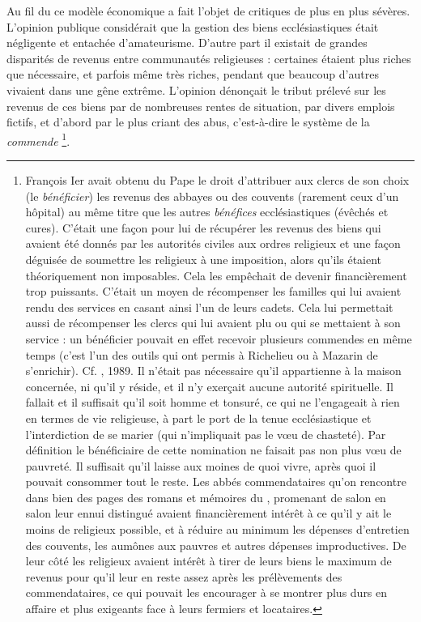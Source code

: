  Au fil du  ce modèle économique a fait l'objet de critiques de plus en plus sévères. L'opinion publique considérait que la gestion des biens ecclésiastiques était négligente et entachée d'amateurisme. D'autre part il existait de grandes disparités de revenus entre communautés religieuses : certaines étaient plus riches que nécessaire, et parfois même très riches, pendant que beaucoup d'autres vivaient dans une gêne extrême. L'opinion dénonçait le tribut prélevé sur les revenus de ces biens par de nombreuses rentes de situation, par divers emplois fictifs, et d'abord par le plus criant des abus, c'est-à-dire le système de la \emph{commende}
\footnote{François Ier avait obtenu du Pape le droit d'attribuer aux clercs de son choix (le \emph{bénéficier}) les revenus des abbayes ou des couvents (rarement ceux d'un hôpital) au même titre que les autres \emph{bénéfices} ecclésiastiques (évêchés et cures). C'était une façon pour lui de récupérer les revenus des biens qui avaient été donnés par les autorités civiles aux ordres religieux et une façon déguisée de soumettre les religieux à une imposition, alors qu'ils étaient théoriquement non imposables. Cela les empêchait de devenir financièrement trop puissants. C'était un moyen de récompenser les familles qui lui avaient rendu des services en casant ainsi l'un de leurs cadets. Cela lui permettait aussi de récompenser les clercs qui lui avaient plu ou qui se mettaient à son service : un bénéficier pouvait en effet recevoir plusieurs commendes en même temps (c'est l'un des outils qui ont permis à Richelieu ou à Mazarin de s'enrichir). Cf. , 1989. Il n'était pas nécessaire qu'il appartienne à la maison concernée, ni qu'il y réside, et il n'y exerçait aucune autorité spirituelle. Il fallait et il suffisait qu'il soit homme et tonsuré, ce qui ne l'engageait à rien en termes de vie religieuse, à part le port de la tenue ecclésiastique et l'interdiction de se marier (qui n'impliquait pas le vœu de chasteté). Par définition le bénéficiaire de cette nomination ne faisait pas non plus vœu de pauvreté. Il suffisait qu'il laisse aux moines de quoi vivre, après quoi il pouvait consommer tout le reste. Les abbés commendataires qu'on rencontre dans bien des pages des romans et mémoires du , promenant de salon en salon leur ennui distingué avaient financièrement intérêt à ce qu'il y ait le moins de religieux possible, et à réduire au minimum les dépenses d'entretien des couvents, les aumônes aux pauvres et autres dépenses improductives. De leur côté les religieux avaient intérêt à tirer de leurs biens le maximum de revenus pour qu'il leur en reste assez après les prélèvements des commendataires, ce qui pouvait les encourager à se montrer plus durs en affaire et plus exigeants face à leurs fermiers et locataires.}. 

